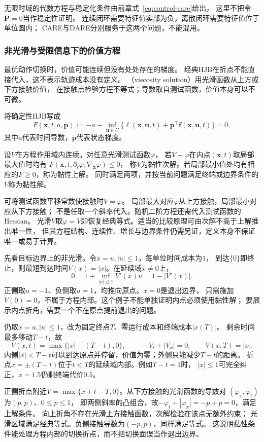 无限时域的代数方程与稳定化条件由前章式~\eqref{eq:control-care}给出，
这里不把令$\dot{\bm P}=0$当作稳定性证明。
连续闭环需要特征值实部为负，离散闭环需要特征值位于单位圆内；
CARE与DARE分别服务于这两个问题，不能混用。

\subsubsection{非光滑与受限信息下的价值方程}

最优动作切换时，价值可能连续但没有处处存在的梯度。
经典HJB在折点不能直接代入，这不表示轨迹成本没有定义。
（viscosity solution）用光滑函数从上方或下方接触价值，
在接触点检验方程不等式；导数取自测试函数，价值本身可以不可微。

将确定性HJB写成
\[
  F(\bm x,t,a,\bm p)
  :=-a-\inf_{\bm u\in U}
      \{\ell(\bm x,\bm u,t)+\bm p^\top\bm f(\bm x,\bm u,t)\}=0,
\]
其中$a$代表时间导数，$\bm p$代表状态梯度。
\begin{definition}[连续价值函数的黏性解]
\label{def:control-viscosity-solution}
设$V$在方程作用域内连续。对任意光滑测试函数$\varphi$，
若$V-\varphi$在内点$(\bm x,t)$取局部最大值时均有
$F(\bm x,t,\partial_t\varphi,\nabla_{\bm x}\varphi)\leq0$，
称$V$为黏性次解。若局部最小值处均有相应的$F\geq0$，称为黏性上解。
同时满足两项，并按当前问题满足终端或边界条件的$V$称为黏性解。
\end{definition}
可将测试函数平移常数使接触时$V=\varphi$。
局部最大对应$\varphi$从上方接触，局部最小对应从下方接触；
不是任取一个斜率代入。随机二阶方程还需代入测试函数的Hessian。
光滑$V$取$\varphi=V$即恢复经典等式。适当的比较原理可由次解不高于上解推出唯一性，
但其方程结构、连续性、增长与边界条件仍需另证，定义本身不保证唯一或易于计算。

先看目标边界上的非光滑。令$\dot x=u,|u|\leq1$，每单位时间成本为$1$，
到达$\{0\}$即终止，则最短到达时间$V(x)=|x|$。在延续域$x\neq0$上，
\[
  0=1+\inf_{|u|\leq1}V'(x)u=1-|V'(x)|.
\]
正侧取$u=-1$、负侧取$u=1$，均推向原点。$x=0$是退出边界，
只需施加$V(0)=0$，不属于方程内部。这个例子不能单独证明内点必须使用黏性解；
要展示内点折角，需要一个不在原点提前退出的问题。

\begin{example}[延续域内部的价值折点]
\label{ex:control-viscosity-interior-kink}
仍取$\dot x=u,|u|\leq1$，改为固定终点$T$、零运行成本和终端成本$|x(T)|$。
剩余时间最多移动$T-t$，故
\[
  V(x,t)=\max\{|x|-(T-t),0\},\qquad
  -V_t+|V_x|=0,\qquad V(x,T)=|x|.
\]
内侧$|x|<T-t$可以到达原点并停留，价值为零；外侧只能减少$T-t$的距离。
折点$x=\pm(T-t)$位于$t<T$的延续域内部。例如$T-t=1$时，
$|x|\leq1$可完全纠正，$x=1.5$仍剩终端代价$0.5$。

正侧折点附近$V=\max\{x+t-T,0\}$。从下方接触的光滑函数的导数对
$(\varphi_x,\varphi_t)$为$(p,p)$、$0\leq p\leq1$，
即两侧斜率的凸组合，故$-\varphi_t+|\varphi_x|=-p+p=0$，满足上解条件。
向上折角不存在光滑上方接触函数，次解检验在该点无额外约束；
光滑区域满足经典等式。负侧接触导数为$(-p,p)$，同样满足等式。
这说明黏性条件能处理方程内部的切换折点，而不把切换面误当作退出边界。
\end{example}

